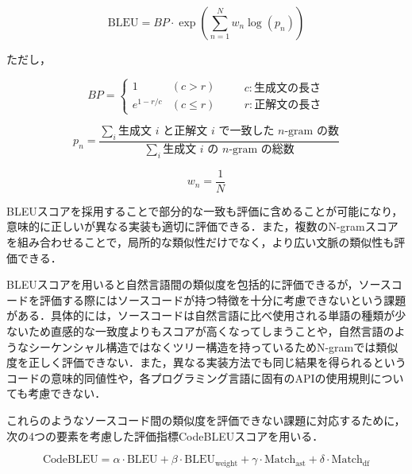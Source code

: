 \documentclass[11pt]{jreport}
\begin{document}
\begin{displaymath}
\text{BLEU} = BP \cdot \exp\left(\sum_{n=1}^{N} w_n \log(p_n)\right)
\end{displaymath}

\noindent
ただし，

\begin{displaymath}
BP =
\begin{cases} 
1 & (c > r) \\ 
e^{1 - r/c} & (c \leq r)
\end{cases}
\quad
\begin{aligned}
&c: \text{生成文の長さ} \\
&r: \text{正解文の長さ}
\end{aligned}
\end{displaymath}

\vspace{1em}

\begin{displaymath}
p_n = \frac{\sum_{i} \text{生成文 }i \text{ と正解文 }i \text{ で一致した } n\text{-gram の数}}{\sum_{i} \text{生成文 }i\text{ の } n\text{-gram の総数}}
\end{displaymath}

\vspace{1em}

\begin{displaymath}
w_n = \frac{1}{N}
\end{displaymath}

BLEUスコアを採用することで部分的な一致も評価に含めることが可能になり，意味的に正しいが異なる実装も適切に評価できる．また，複数のN-gramスコアを組み合わせることで，局所的な類似性だけでなく，より広い文脈の類似性も評価できる．

BLEUスコアを用いると自然言語間の類似度を包括的に評価できるが，ソースコードを評価する際にはソースコードが持つ特徴を十分に考慮できないという課題がある．具体的には，ソースコードは自然言語に比べ使用される単語の種類が少ないため直感的な一致度よりもスコアが高くなってしまうことや，自然言語のようなシーケンシャル構造ではなくツリー構造を持っているためN-gramでは類似度を正しく評価できない．また，異なる実装方法でも同じ結果を得られるというコードの意味的同値性や，各プログラミング言語に固有のAPIの使用規則についても考慮できない．

これらのようなソースコード間の類似度を評価できない課題に対応するために，次の4つの要素を考慮した評価指標CodeBLEUスコアを用いる．

\begin{displaymath}
\text{CodeBLEU} = \alpha \cdot \text{BLEU} + \beta \cdot \text{BLEU}_{\text{weight}} + \gamma \cdot \text{Match}_{\text{ast}} + \delta \cdot \text{Match}_{\text{df}}
\end{displaymath}
\end{document}
